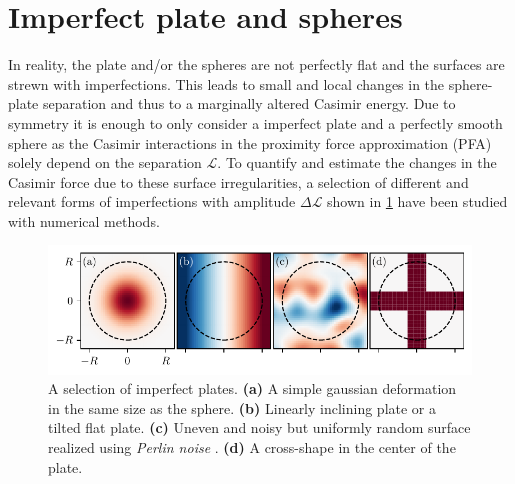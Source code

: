 \section{Imperfect plate and spheres}
\label{sec:3:imperfect-plates}

In reality, the plate and/or the spheres are not perfectly flat and the surfaces are strewn with imperfections.
This leads to small and local changes in the sphere-plate separation and thus to a marginally altered Casimir energy.
Due to symmetry it is enough to only consider a imperfect plate and a perfectly smooth sphere as the Casimir interactions in the proximity force approximation (PFA) solely depend on the separation $\mathscr{L}$.
To quantify and estimate the changes in the Casimir force due to these surface irregularities, a selection of different and relevant forms of imperfections with amplitude $\Delta \mathscr{L}$ shown in \cref{fig:3:imperfect-plates} have been studied with numerical methods.
\begin{figure}[!htbp]
  \centering
  \includegraphics[width=\textwidth]{../figures/casimir/imperfect-plates-advanced.pdf}
  \caption{A selection of imperfect plates. \textbf{(a)} A simple gaussian deformation in the same size as the sphere. \textbf{(b)} Linearly inclining plate or a tilted flat plate. \textbf{(c)} Uneven and noisy but uniformly random surface realized using \textit{Perlin noise} \cite{Perlin_1985}. \textbf{(d)} A cross-shape in the center of the plate.}
  \label{fig:3:imperfect-plates}
\end{figure}
